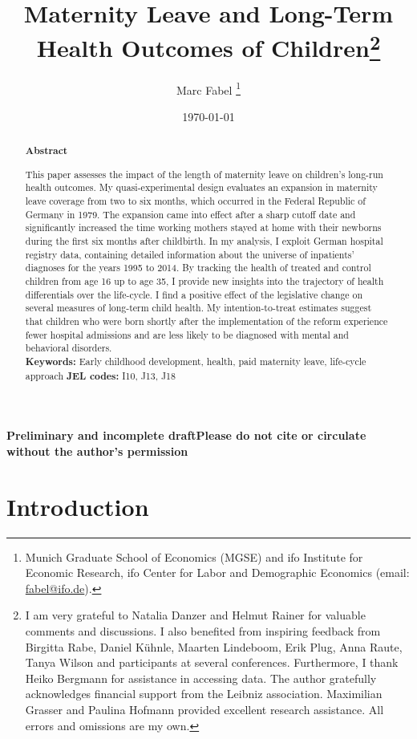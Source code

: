 \documentclass[11pt, a4paper,draft]{article} %
\title{Maternity Leave and Long-Term Health Outcomes of Children\footnote{I am very grateful to Natalia Danzer and Helmut Rainer for valuable comments and discussions. I also benefited from inspiring feedback from Birgitta Rabe, Daniel Kühnle, Maarten Lindeboom, Erik Plug, Anna Raute, Tanya Wilson and participants at several conferences. Furthermore, I thank Heiko Bergmann for assistance in accessing data. The author gratefully acknowledges financial support from the Leibniz association. Maximilian Grasser and Paulina Hofmann provided excellent research assistance. All errors and omissions are my own.
}}
\author{
	Marc Fabel 
		\thanks{Munich Graduate School of Economics (MGSE) and ifo Institute for Economic Research, ifo Center for Labor and Demographic Economics (email: \href{mailto:fabel@ifo.de}{fabel@ifo.de}).
		}
}
\date{\monthyeardate\today}
\begin{document}
\setcounter{page}{0}  
\tableofcontents
\newpage
\setcounter{page}{1}    
\maketitle

\textbf{\color{red} Preliminary and incomplete draft\newline Please do not cite or circulate without the author's permission}
\renewcommand{\abstractname}{\vspace{-\baselineskip}} %

  \begin{abstract}\noindent 
   \footnotesize{\begin{center}\textbf{Abstract}\end{center} This paper assesses the impact of the length of maternity leave on children’s long-run health outcomes. My quasi-experimental design evaluates an expansion in maternity leave coverage from two to six months, which occurred in the Federal Republic of Germany in 1979. The expansion came into effect after a sharp cutoff date and significantly increased the time working mothers stayed at home with their newborns during the first six months after childbirth. In my analysis, I exploit German hospital registry data, containing detailed information about the universe of inpatients' diagnoses for the years 1995 to 2014. 
   By tracking the health of treated and control children from age 16 up to age 35, I provide new insights into the trajectory of health differentials over the life-cycle.
   I find a positive effect of the legislative change on several measures of long-term child health. My intention-to-treat estimates suggest that children who were born shortly after the implementation of the reform experience fewer hospital admissions and are less likely to be diagnosed with mental and behavioral disorders.
   	\\\newline \textbf{Keywords:} Early childhood development, health, paid maternity leave, life-cycle approach \newline \textbf{JEL codes:} I10, J13, J18}
    \end{abstract}

\newpage


\section{Introduction}\label{sec:introduction}
\end{document}
